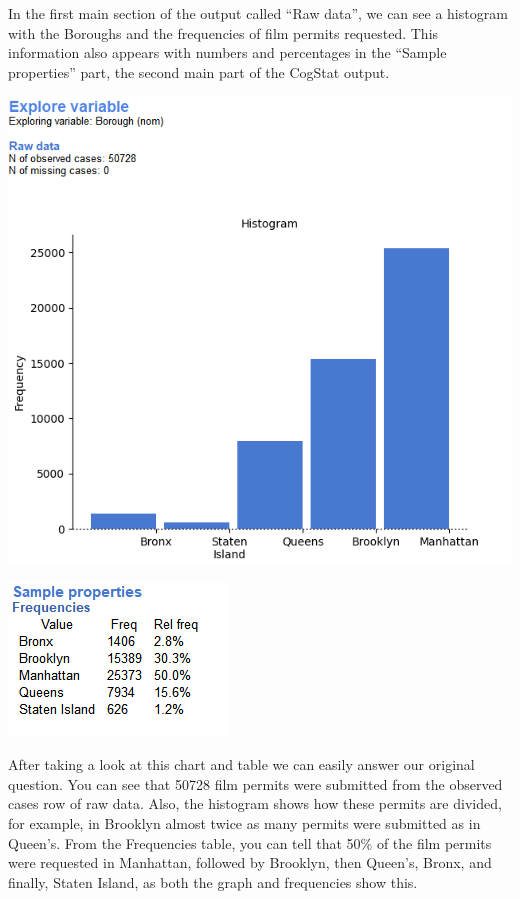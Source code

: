 \documentclass[
]{book}
\begin{document}
In the first main section of the output called ``Raw data'', we can see a histogram with the Boroughs and the frequencies of film permits requested. This information also appears with numbers and percentages in the ``Sample properties'' part, the second main part of the CogStat output.

\includegraphics{img/ch1/exp.graph1.png}

\includegraphics{img/ch1/exp.des..png}

After taking a look at this chart and table we can easily answer our original question. You can see that 50728 film permits were submitted from the observed cases row of raw data. Also, the histogram shows how these permits are divided, for example, in Brooklyn almost twice as many permits were submitted as in Queen's. From the Frequencies table, you can tell that 50\% of the film permits were requested in Manhattan, followed by Brooklyn, then Queen's, Bronx, and finally, Staten Island, as both the graph and frequencies show this.
\end{document}
